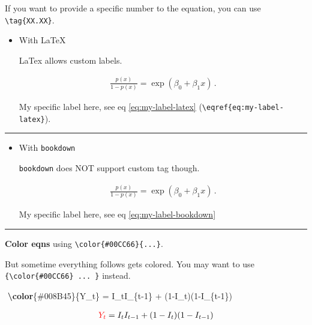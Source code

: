 \documentclass[
]{book}
\newenvironment{Shaded}{\begin{snugshade}}{\end{snugshade}}
\newcommand{\SpecialCharTok}[1]{\textcolor[rgb]{0.81,0.36,0.00}{\textbf{#1}}}
\newcommand{\SpecialStringTok}[1]{\textcolor[rgb]{0.31,0.60,0.02}{#1}}
\theoremstyle{definition}
\theoremstyle{definition}
\theoremstyle{definition}
\theoremstyle{definition}
\theoremstyle{remark}
\begin{document}
If you want to provide a specific number to the equation, you can use \texttt{\textbackslash{}tag\{XX.XX\}}.

\begin{itemize}
\item
  With LaTeX

  LaTex allows custom labels.

  \begin{align} \label{eq:my-label-latex} \tag{my label latex}
  \frac{p(x)}{1-p(x)} = \exp (\beta_0+\beta_1 x) \,.
  \end{align}

  My specific label here, see eq \eqref{eq:my-label-latex} (\texttt{\textbackslash{}eqref\{eq:my-label-latex\}}).
\end{itemize}

\begin{center}\rule{0.5\linewidth}{0.5pt}\end{center}

\begin{itemize}
\item
  With \texttt{bookdown}

  \texttt{bookdown} does NOT support custom tag though.

  \begin{align}
  \frac{p(x)}{1-p(x)} = \exp (\beta_0+\beta_1 x) \,.
  \label{eq:my-label-bookdown}
  \end{align}

  My specific label here, see eq \eqref{eq:my-label-bookdown}
\end{itemize}

\begin{center}\rule{0.5\linewidth}{0.5pt}\end{center}

\textbf{Color eqns} using \texttt{\textbackslash{}color\{\#00CC66\}\{...\}}.

But sometime everything follows gets colored. You may want to use \texttt{\{\textbackslash{}color\{\#00CC66\}\ ...\ \}} instead.

\begin{Shaded}
\begin{Highlighting}[]
\SpecialStringTok{$$}
\SpecialCharTok{\textbackslash{}color}\SpecialStringTok{\{\#008B45\}\{Y\_t\} = I\_tI\_\{t{-}1\} + (1{-}I\_t)(1{-}I\_\{t{-}1\})}
\SpecialStringTok{$$}
\end{Highlighting}
\end{Shaded}

\begin{align*}
{\color{red}Y_t} = I_tI_{t-1} + (1-I_t)(1-I_{t-1})
\end{align*}
\end{document}
